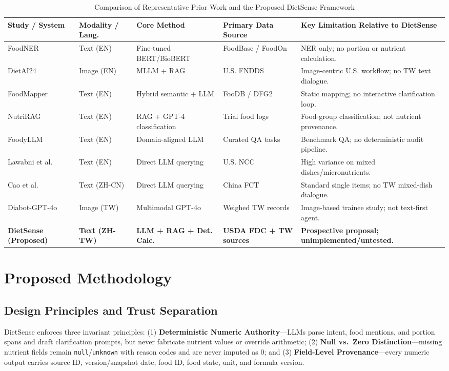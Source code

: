 \documentclass[conference]{IEEEtran}
\begin{document}
\begin{table}[t]
\centering
\caption{Comparison of Representative Prior Work and the Proposed DietSense Framework}
\label{tab:related_work}
\renewcommand{\arraystretch}{1.15}
\begin{tabularx}{\textwidth}{@{}l l l l X@{}}
\toprule
\textbf{Study / System} & \textbf{Modality / Lang.} & \textbf{Core Method} & \textbf{Primary Data Source} & \textbf{Key Limitation Relative to DietSense} \\
\midrule
FoodNER~\cite{stojanov2021foodner} & Text (EN) & Fine-tuned BERT/BioBERT & FoodBase / FoodOn & NER only; no portion or nutrient calculation. \\
DietAI24~\cite{yan2025dietai24} & Image (EN) & MLLM + RAG & U.S. FNDDS & Image-centric U.S. workflow; no TW text dialogue. \\
FoodMapper~\cite{lemay2026foodmapper} & Text (EN) & Hybrid semantic + LLM & FooDB / DFG2 & Static mapping; no interactive clarification loop. \\
NutriRAG~\cite{zhou2026nutrirag} & Text (EN) & RAG + GPT-4 classification & Trial food logs & Food-group classification; not nutrient provenance. \\
FoodyLLM~\cite{gjorgjevikj2026foodyllm} & Text (EN) & Domain-aligned LLM & Curated QA tasks & Benchmark QA; no deterministic audit pipeline. \\
Lawabni et al.~\cite{lawabni2026text} & Text (EN) & Direct LLM querying & U.S. NCC & High variance on mixed dishes/micronutrients. \\
Cao et al.~\cite{cao2026chinese} & Text (ZH-CN) & Direct LLM querying & China FCT & Standard single items; no TW mixed-dish dialogue. \\
Diabot-GPT-4o~\cite{chen2025diabot} & Image (TW) & Multimodal GPT-4o & Weighed TW records & Image-based trainee study; not text-first agent. \\
\textbf{DietSense (Proposed)} & \textbf{Text (ZH-TW)} & \textbf{LLM + RAG + Det. Calc.} & \textbf{USDA FDC + TW sources} & \textbf{Prospective proposal; unimplemented/untested.} \\
\bottomrule
\end{tabularx}
\end{table}

\section{Proposed Methodology}
\subsection{Design Principles and Trust Separation}
DietSense enforces three invariant principles: (1) \textbf{Deterministic Numeric Authority}---LLMs parse intent, food mentions, and portion spans and draft clarification prompts, but never fabricate nutrient values or override arithmetic; (2) \textbf{Null vs.\ Zero Distinction}---missing nutrient fields remain \texttt{null}/\texttt{unknown} with reason codes and are never imputed as $0$; and (3) \textbf{Field-Level Provenance}---every numeric output carries source ID, version/snapshot date, food ID, food state, unit, and formula version.
\end{document}
